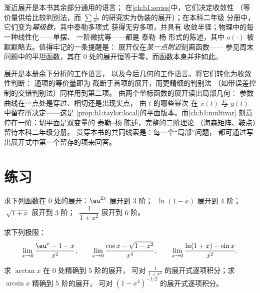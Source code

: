 \begin{remark}[展开的后续应用]
渐近展开是本书其余部分通用的语言；
在\cref{ch:b1:series}中，它们决定收敛性
（等价量供给比较判别法，而 $\sum
\frac{1}{n^\alpha}$ 的研究实为伪装的展开）；在本科二年级
分册中，它们变为\emph{幂级数}，其中泰勒多项式
获得无穷多项，并具有
收敛半径；物理中的每一种线性化——单摆、
一阶微扰等——都是 泰勒–杨 形式的陈述，其中
$o(\cdot)$ 被默默略去。值得牢记的一条提醒是：
展开仅在\emph{某一点附近}刻画函数——
参见周末问题中的平坦函数，其在
$0$ 处的展开恒等于零，而函数本身并非如此。
\end{remark}

\begin{remark}[本册内的展望]
展开是本册余下分析的工作语言，
以及今后几何的工作语言。将它们转化为收敛性判断：
通项的等价量即为
截断于首项的展开，而更精细的判别法
（如带误差控制的交错判别法）同样用到第二项。
由两个坐标函数的展开读出局部几何：
参数曲线在一点处是穿过、相切还是出现尖点，
由 $t$ 的哪些幂次
在 $x(t)$ 与 $y(t)$ 中留存所决定——这是
\cref{prop:b1:taylor:local}的平面版本。而\cref{ch:b1:multivar}
刻意停在一阶：切平面是双变量的
泰勒–杨 陈述，完整的二阶理论
（海森矩阵、鞍点）留待本科二年级分册。
贯穿本书的共同线索是：每一个“局部”问题，
都可通过写出展开式中第一个留存的项来回答。
\end{remark}

\section{练习}

\begin{exercise}[$\star$]\label{exo:b1:taylor:1}
求下列函数在 $0$ 处的展开：$\eu^{2x}$ 展开到 $3$ 阶；
$\;\ln(1 - x)$ 展开到 $4$ 阶；$\;\sqrt{1 + x}$ 展开到 $3$ 阶；
$\;\dfrac{1}{1 + x^2}$ 展开到 $6$ 阶。
\end{exercise}

\begin{exercise}[$\star$]\label{exo:b1:taylor:2}
求下列极限：
\[
\lim_{x\to 0} \frac{\eu^x - 1 - x}{x^2},
\qquad
\lim_{x\to 0} \frac{\cos x - \sqrt{1 - x^2}}{x^4},
\qquad
\lim_{x\to 0} \frac{\ln(1+x) - \sin x}{x^2}.
\]
\end{exercise}

\begin{exercise}[$\star$]\label{exo:b1:taylor:3}
求 $\arctan x$ 在 $0$ 处精确到 $5$ 阶的展开，
可对 $\frac{1}{1 + x^2}$ 的展开式逐项积分；求 $\arcsin x$ 精确到 $5$ 阶的展开，
可对 $(1 - x^2)^{-1/2}$ 的展开式逐项积分。
\end{exercise}

